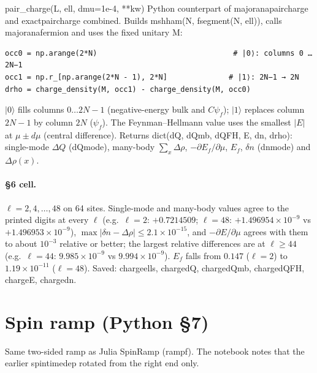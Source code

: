 \documentclass[11pt]{article}
\newcommand{\codeus}{\textunderscore\allowbreak}
\renewcommand{\code}[1]{{\ttfamily\let\_\codeus #1}}
\begin{document}
\begin{function}{pair\_charge(L, ell, dmu=1e-4, **kw)}
Python counterpart of \code{majorana\_pair\_charge} and \code{exact\_pair\_charge} combined. Builds \code{msh\_ham(N, f\_segment(N, ell))}, calls \code{majorana\_fermion} and uses the fixed unitary \code{M}:
\begin{Verbatim}
occ0 = np.arange(2*N)                               # |0⟩: columns 0 … 2N−1
occ1 = np.r_[np.arange(2*N - 1), 2*N]              # |1⟩: 2N−1 → 2N
drho = charge_density(M, occ1) - charge_density(M, occ0)
\end{Verbatim}
$|0\rangle$ fills columns $0\dots2N-1$ (negative-energy bulk and $C\psi_f$); $|1\rangle$ replaces column $2N-1$ by column $2N$ ($\psi_f$). The Feynman–Hellmann value uses the smallest $|E|$ at $\mu\pm d\mu$ (central difference). Returns \code{dict(dQ, dQ\_mb, dQ\_FH, E, dn, drho)}: single-mode $\Delta Q$ (\code{dQ\_mode}), many-body $\sum_x\Delta\rho$, $-\partial E_f/\partial\mu$, $E_f$, $\delta n$ (\code{dn\_mode}) and $\Delta\rho(x)$.
\end{function}

\paragraph{§6 cell.} $\ell=2,4,\dots,48$ on 64 sites. Single-mode and many-body values agree to the printed digits at every $\ell$ (e.g.\ $\ell=2$: $+0.7214509$; $\ell=48$: $+1.496954\times10^{-9}$ vs $+1.496953\times10^{-9}$), $\max|\delta n-\Delta\rho|\le2.1\times10^{-15}$, and $-\partial E/\partial\mu$ agrees with them to about $10^{-3}$ relative or better; the largest relative differences are at $\ell\ge44$ (e.g.\ $\ell=44$: $9.985\times10^{-9}$ vs $9.994\times10^{-9}$). $E_f$ falls from $0.147$ ($\ell=2$) to $1.19\times10^{-11}$ ($\ell=48$). Saved: \code{charge\_ells}, \code{charge\_dQ}, \code{charge\_dQ\_mb}, \code{charge\_dQ\_FH}, \code{charge\_E}, \code{charge\_dn}.

\section{Spin ramp (Python §7)}
\label{sec:py-ramp}

Same two-sided ramp as Julia \code{SpinRamp} (\code{ramp\_f}). The notebook notes that the earlier \code{spin\_timedep} rotated from the right end only.
\end{document}
